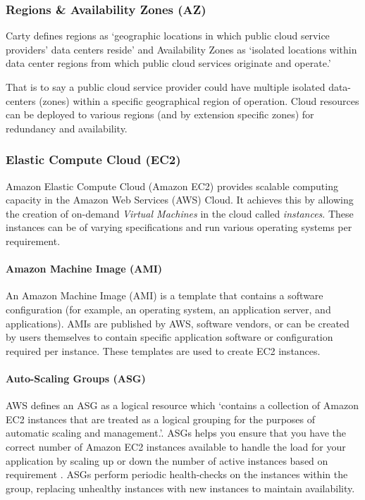 \subsubsection{Regions \& Availability Zones (AZ)}
Carty defines regions as `geographic locations in which public cloud service providers' data centers reside'
and Availability Zones as `isolated locations within data center regions from which public cloud services originate and operate.'\cite{carty_2015}

That is to say a public cloud service provider could have multiple isolated data-centers (zones) within a specific geographical region of operation.
Cloud resources can be deployed to various regions (and by extension specific zones) for redundancy and availability.

\subsubsection{Elastic Compute Cloud (EC2)}
Amazon Elastic Compute Cloud (Amazon EC2) provides scalable computing capacity in the Amazon Web Services (AWS) Cloud\cite{awsdocs_whatsisec2}.
It achieves this by allowing the creation of on-demand \emph{Virtual Machines} in the cloud called \emph{instances}\cite{carty_2019}. 
These instances can be of varying specifications \cite{daly_2022} and run various operating systems \cite{awsdocs_ec2os} per requirement.

\paragraph{Amazon Machine Image (AMI)}
An Amazon Machine Image (AMI) is a template that contains a software configuration (for example, an operating system, an application server, and applications)\cite{awsdocs_ami}.
AMIs are published by AWS, software vendors, or can be created by users themselves to contain specific application software or configuration required per instance.
These templates are used to create EC2 instances\cite{Beach2014}. 

\paragraph{Auto-Scaling Groups (ASG)}
AWS defines an ASG as a logical resource which `contains a collection of Amazon EC2 instances that are treated as a logical grouping for the purposes of automatic scaling and management.'\cite{awsdocs_asg}.
ASGs helps you ensure that you have the correct number of Amazon EC2 instances available to handle the load for your application by scaling up or down the number of active instances based on requirement \cite{amazon_asg_docs}. 
ASGs perform periodic health-checks on the instances within the group, replacing unhealthy instances with new instances to maintain availability.

